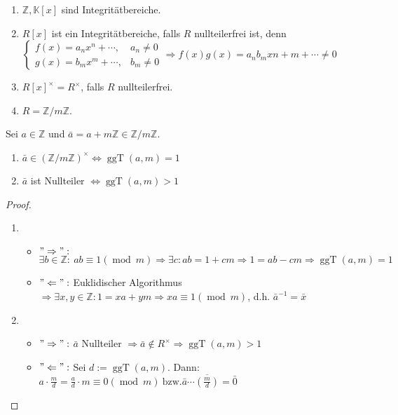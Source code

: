 \begin{example}
    \begin{enumerate}
        \item \(\mathbb{Z},\mathbb{K}[x]\) sind Integrit\"atbereiche.
        \item \(R[x]\) ist ein Integrit\"atbereiche, falls \(R\)  nullteilerfrei ist, denn \(\begin{cases}
            f(x)=a_nx^n+\cdots,&a_n\not = 0\\
            g(x)=b_mx^m+\cdots,&b_m\not = 0
        \end{cases}\Rightarrow f(x)g(x)=a_nb_mx{n+m}+\cdots\not =0\)
        \item \(R[x]^\times = R^\times\), falls \(R\) nullteilerfrei.
        \item \(R=\mathbb{Z}/m\mathbb{Z}\).
    \end{enumerate}
\end{example}
\begin{lemma}
    Sei \(a\in\mathbb{Z}\) und \(\bar{a}=a+m\mathbb{Z}\in\mathbb{Z}/m\mathbb{Z}\).\begin{enumerate}
        \item \(\bar{a}\in(\mathbb{Z}/m\mathbb{Z})^\times\Leftrightarrow \operatorname{ggT}(a,m)=1\)
        \item \(\bar{a}\) ist Nullteiler \(\Leftrightarrow \operatorname{ggT}(a,m)>1\)
    \end{enumerate}
\end{lemma}
\begin{proof}
    \begin{enumerate}
        \item \begin{itemize}
            \item \("\Rightarrow":\) \(\exists b\in\mathbb{Z}:\ ab \equiv 1(\operatorname{mod}\ m)\Rightarrow\exists c:ab=1+cm\Rightarrow 1=ab-cm\Rightarrow \operatorname{ggT}(a,m)=1\)
            \item \("\Leftarrow":\) Euklidischer Algorithmus \(\Rightarrow \exists x,y\in\mathbb{Z}:1=xa+ym\Rightarrow xa\equiv 1(\operatorname{mod}\ m)\), d.h. \(\bar{a}^{-1} =\bar{x}\)
        \end{itemize}
        \item \begin{itemize}
            \item \("\Rightarrow":\) \(\bar{a}\) Nullteiler \(\Rightarrow \bar{a}\notin R^\times\Rightarrow \operatorname{ggT}(a,m)>1\)
            \item \("\Leftarrow":\) Sei \(d:=\operatorname{ggT}(a,m)\). Dann: \(a\cdot\frac{m}{d}=\frac{a}{d}\cdot m \equiv 0(\operatorname{mod}\ m)\ \text{bzw.}\bar{a}\cdots \overline{\left(\frac{m}{d}\right)}=\bar{0}\)
        \end{itemize}
    \end{enumerate}
\end{proof}

